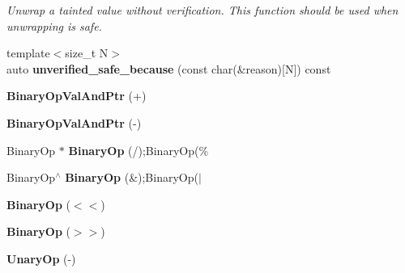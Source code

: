 \begin{DoxyCompactItemize}
\begin{DoxyCompactList}\small\item\em Unwrap a tainted value without verification. This function should be used when unwrapping is safe. \end{DoxyCompactList}\item 
\mbox{\label{classrlbox_1_1tainted__base__impl_a88d4ea11a08ad91cb7ead1b80908f7f2}} 
{\footnotesize template$<$size\+\_\+t N$>$ }\\auto {\bfseries unverified\+\_\+safe\+\_\+because} (const char(\&reason)\mbox{[}N\mbox{]}) const
\item 
\mbox{\label{classrlbox_1_1tainted__base__impl_ac11254da0346088f7e2ccfdccf87deb1}} 
{\bfseries Binary\+Op\+Val\+And\+Ptr} (+)
\item 
\mbox{\label{classrlbox_1_1tainted__base__impl_ab64e73357c9a9387ca281d31e17bc490}} 
{\bfseries Binary\+Op\+Val\+And\+Ptr} (-\/)
\item 
\mbox{\label{classrlbox_1_1tainted__base__impl_af6fc3e13ab58feba9d6df1b9965055c0}} 
Binary\+Op $\ast$ {\bfseries Binary\+Op} (/);Binary\+Op(\%
\item 
\mbox{\label{classrlbox_1_1tainted__base__impl_a03f7e6cbb4ac6cc48b5f523c69863fee}} 
Binary\+Op$^\wedge$ {\bfseries Binary\+Op} (\&);Binary\+Op($\vert$
\item 
\mbox{\label{classrlbox_1_1tainted__base__impl_a100c45337a0ad48eb18ac977edb8cc48}} 
{\bfseries Binary\+Op} ($<$$<$)
\item 
\mbox{\label{classrlbox_1_1tainted__base__impl_a60f6d9cc0d8462291f461e4183d90ec7}} 
{\bfseries Binary\+Op} ($>$$>$)
\item 
\mbox{\label{classrlbox_1_1tainted__base__impl_a30945c75dace33aa34d77c839e50d49a}} 
{\bfseries Unary\+Op} (-\/)
\item 
\mbox{\label{classrlbox_1_1tainted__base__impl_ac450c85ec8fa3c5046bcf3fb7aeca2d1}} 

\end{DoxyCompactItemize}
